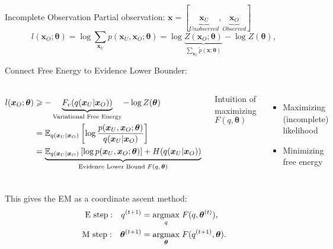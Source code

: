 \begin{frame}
  {Incomplete Observation}
  Partial observation: $\bm{x} = [  \underbrace{\bm{x}_U}_{Unobserved}, \underbrace{\bm{x}_O}_{Observed}]$
  \begin{equation*}
    l(\bm{x}_O; \bm{\theta}) = \log{\sum_{\bm{x}_U}p(\bm{x}_U, \bm{x}_O; \bm{\theta})} = \log{\underbrace{Z(\bm{x}_O;\bm{\theta})}_{\sum_{\bm{x}_U}\tilde{p}(\bm{x}; \bm{\theta})}} - \log{Z(\bm{\theta})},
  \end{equation*}

  {Connect Free Energy to Evidence Lower Bounder}:
  \begin{columns}
    \begin{align*}
      l(\bm{x}_O; \bm{\theta}) &\geqslant - \underbrace{F_v(q(\bm{x}_U|\bm{x}_O))}_{\text{Variational Free Energy}} - \log{Z(\bm{\theta})} \nonumber \\
                               & = \mathbb{E}_{q(\bm{x}_U|\bm{x}_O)}\left[ \log{\frac{{p}(\bm{x}_U, \bm{x}_O; \bm{\theta})}{q(\bm{x}_U|\bm{x}_O)}} \right] \nonumber \\
                               & = \underbrace{\mathbb{E}_{q(\bm{x}_U|\bm{x}_O)}\left[ \log{{p}(\bm{x}_U, \bm{x}_O; \bm{\theta})} \right] + H({q(\bm{x}_U|\bm{x}_O)})}_{\text{Evidence Lower Bound $F(q, \bm{\theta})$}}
    \end{align*}
    
    Intuition of maximizing $F(q,\bm{\theta})$
    \begin{itemize}[label=\textbullet]
    \item Maximizing (incomplete) likelihood
    \item Minimizing free energy
    \end{itemize}

  \end{columns}
  This gives the EM as a coordinate ascent method:
  \begin{align*}
    \mathrm{E~step:}~~~ q^{(t+1)} &= \underset{q}{\operatorname{argmax}}\;{F(q, \bm{\theta}^{(t)})}, \\
    \mathrm{M~step:}~~~\bm{\theta}^{(t+1)} &= \underset{\bm{\theta}}{\operatorname{argmax}}\;{F(q^{(t+1)}, \bm{\theta})}.
  \end{align*}
\end{frame}


